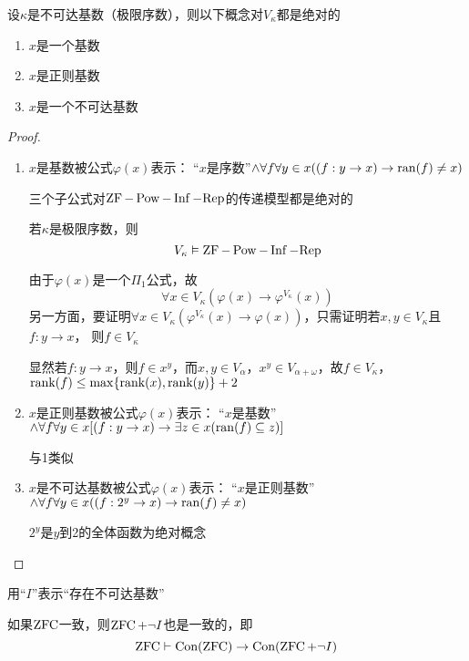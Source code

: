 \documentclass[11pt]{article}
\def \Rep {\text{Rep}}
\begin{document}
\begin{lemma}[]
设\(\kappa\)是不可达基数（极限序数），则以下概念对\(V_\kappa\)都是绝对的
\begin{enumerate}
\item \(x\)是一个基数
\item \(x\)是正则基数
\item \(x\)是一个不可达基数
\end{enumerate}
\end{lemma}

\begin{proof}
\begin{enumerate}
\item \(x\)是基数被公式\(\varphi(x)\)表示：
“\(x\)是序数”\(\wedge\forall f\forall y\in x((f:y\to x)\to\operatorname{ran}(f)\neq x)\)

三个子公式对\(\ZF-\Pow-\Inf-\Rep\)的传递模型都是绝对的

若\(\kappa\)是极限序数，则
\begin{equation*}
V_\kappa\vDash\ZF-\Pow-\Inf-\Rep
\end{equation*}

由于\(\varphi(x)\)是一个\(\Pi_1\)公式，故
\begin{equation*}
\forall x\in V_\kappa(\varphi(x)\to\varphi^{V_\kappa}(x))
\end{equation*}
另一方面，要证明\(\forall x\in V_\kappa(\varphi^{V_\kappa}(x)\to\varphi(x))\)，只需证明若\(x,y\in V_\kappa\)且\(f:y\to x\)，
则\(f\in V_\kappa\)

显然若\(f:y\to x\)，则\(f\in x^y\)，而\(x,y\in V_\alpha\)，\(x^y\in V_{\alpha+\omega}\)，故\(f\in V_\kappa\)，
\(\text{rank}(f)\le\max\{\text{rank}(x),\text{rank}(y)\}+2\)
\item \(x\)是正则基数被公式\(\varphi(x)\)表示：
“\(x\)是基数”\(\wedge\forall f\forall y\in x[(f:y\to x)\to\exists z\in x(\operatorname{ran}(f)\subseteq z)]\)

与1类似
\item \(x\)是不可达基数被公式\(\varphi(x)\)表示：
“\(x\)是正则基数”\(\wedge\forall f\forall y\in x((f:2^y\to x)\to\operatorname{ran}(f)\neq x)\)

\(2^y\)是\(y\)到2的全体函数为绝对概念
\end{enumerate}
\end{proof}

用“\(I\)”表示“存在不可达基数”

\begin{lemma}[]
如果\(\operatorname{ZFC}\)一致，则\(\operatorname{ZFC}+\neg I\)也是一致的，即
\begin{equation*}
\operatorname{ZFC}\vdash\text{Con}(\operatorname{ZFC})\to\text{Con}(\operatorname{ZFC}+\neg I)
\end{equation*}
\end{lemma}
\end{document}

